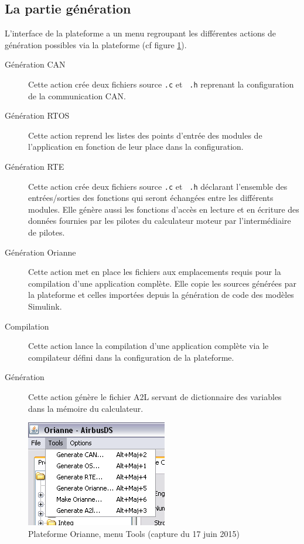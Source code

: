 \subsection{La partie génération}
L'interface de la plateforme a un menu regroupant les différentes actions de
génération possibles via la plateforme (cf figure \ref{fig:toolsMenu}).
\begin{description}
  \item[Génération CAN] Cette action crée deux fichiers source {\tt.c} et {\tt
	.h} reprenant la configuration de la communication CAN.
  \item[Génération RTOS] Cette action reprend les listes des points d'entrée des
	modules de l'application en fonction de leur place dans la configuration.
  \item[Génération RTE] Cette action crée deux fichiers source {\tt.c} et {\tt
	.h} déclarant l'ensemble des entrées/sorties des fonctions qui seront
	échangées entre les différents modules. Elle génère aussi les fonctions
	d'accès en lecture et en écriture des données fournies par les pilotes du
	calculateur moteur par l'intermédiaire de pilotes.
  \item[Génération Orianne] Cette action met en place les fichiers aux
	emplacements requis pour la compilation d'une application complète. Elle
	copie les sources générées par la plateforme et celles importées depuis la
	génération de code des modèles Simulink\up{\circledR}.
  \item[Compilation] Cette action lance la compilation d'une application
	complète via le compilateur défini dans la configuration de la plateforme.
  \item[Génération ] Cette action génère le fichier A2L servant de
	dictionnaire des variables dans la mémoire du calculateur.
\end{description}

\begin{figure}[h]
  \centering
  \includegraphics[scale=0.7]{images/toolsMenu}
  \caption{Plateforme Orianne, menu Tools (capture du 17 juin 2015)}
  \label{fig:toolsMenu}
\end{figure}


